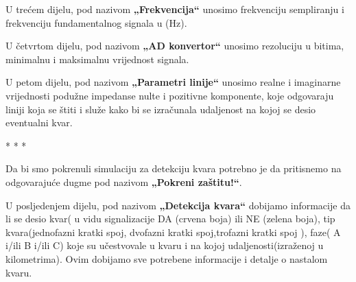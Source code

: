 U trećem dijelu, pod nazivom \textbf{„Frekvencija“} unosimo frekvenciju sempliranju i frekvenciju fundamentalnog signala u (Hz).

U četvrtom dijelu, pod nazivom \textbf{„AD konvertor“} unosimo rezoluciju u bitima, minimalnu i maksimalnu  vrijednost signala.

U petom dijelu, pod nazivom \textbf{„Parametri linije“} unosimo realne i imaginarne vrijednosti podužne impedanse nulte i pozitivne komponente, koje odgovaraju liniji koja se štiti i služe kako bi se izračunala udaljenost na kojoj se desio eventualni kvar. 

\vspace{0.5cm}
\begin{center}
    * * *
\end{center}

\vspace{0.5cm}

Da bi smo pokrenuli simulaciju za detekciju kvara potrebno je da pritisnemo na odgovarajuće dugme pod nazivom \textbf{ „Pokreni zaštitu!“}.


U posljedenjem dijelu, pod nazivom \textbf{„Detekcija kvara“} dobijamo informacije da li se desio kvar( u vidu signalizacije DA (crvena boja) ili NE (zelena boja), tip kvara(jednofazni kratki spoj, dvofazni kratki spoj,trofazni kratki spoj ), faze( A  i/ili  B  i/ili  C) koje su učestvovale u kvaru i na kojoj udaljenosti(izraženoj u kilometrima). Ovim dobijamo sve potrebene informacije i detalje o nastalom kvaru.


